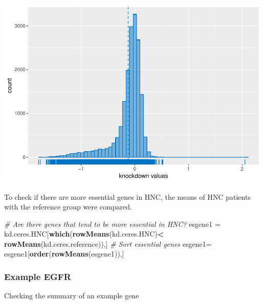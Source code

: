 \documentclass[]{article}
\newenvironment{Shaded}{\begin{snugshade}}{\end{snugshade}}
\newcommand{\KeywordTok}[1]{\textcolor[rgb]{0.13,0.29,0.53}{\textbf{#1}}}
\newcommand{\StringTok}[1]{\textcolor[rgb]{0.31,0.60,0.02}{#1}}
\newcommand{\CommentTok}[1]{\textcolor[rgb]{0.56,0.35,0.01}{\textit{#1}}}
\newcommand{\OperatorTok}[1]{\textcolor[rgb]{0.81,0.36,0.00}{\textbf{#1}}}
\newcommand{\NormalTok}[1]{#1}
\begin{document}
\includegraphics{Project_HNC_files/figure-latex/1_knockdown_values2-1.pdf}

To check if there are more essential genes in HNC, the means of HNC
patients with the reference group were compared.

\begin{Shaded}
\begin{Highlighting}[]
\CommentTok{# Are there genes that tend to be more essential in HNC?}
\NormalTok{esgene1 =}\StringTok{ }\NormalTok{kd.ceres.HNC[}\KeywordTok{which}\NormalTok{(}\KeywordTok{rowMeans}\NormalTok{(kd.ceres.HNC)}\OperatorTok{<}\StringTok{ }\KeywordTok{rowMeans}\NormalTok{(kd.ceres.reference)),]}
\CommentTok{# Sort essential genes}
\NormalTok{esgene1=}\StringTok{ }\NormalTok{esgene1[}\KeywordTok{order}\NormalTok{(}\KeywordTok{rowMeans}\NormalTok{(esgene1)),]}
\end{Highlighting}
\end{Shaded}

\subsubsection{Example EGFR}\label{example-egfr}

Checking the summary of an example gene

\begin{Shaded}
\end{Shaded}
\end{document}
